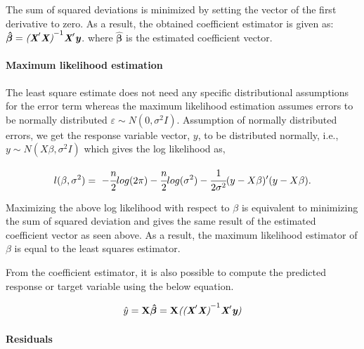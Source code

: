 \documentclass[12 pt]{scrartcl}
\begin{document}
The sum of squared deviations is minimized by setting the vector of the first derivative to zero. As a result, the obtained coefficient estimator is given as:\\
${\boldsymbol{\hat{\beta}}} = {\emph{({\textbf{X}}}'\emph{\textbf{X}}\emph{)}}^{-1} \emph{{\textbf{X}}}'{\emph{{\textbf{y}}}} $.
where ${\boldsymbol{\hat{\beta}}}$ is the estimated coefficient vector. 

\paragraph{Maximum likelihood estimation}
The least square estimate does not need any specific distributional assumptions for the error term whereas the maximum likelihood estimation assumes errors to be normally distributed $\varepsilon \sim  N(0, \sigma^2I)$. Assumption of normally distributed errors, we get  the response variable vector, $y$, to be distributed normally, i.e., $y \sim N(X\beta, \sigma^2I)$ which gives the log likelihood as,

\begin{equation} \label{eq:1} l(\beta, \sigma^2)=\ - \cfrac{n}{2}log(2\pi)- \cfrac{n}{2}log(\sigma^2)-\cfrac{1}{2\sigma^2}(y-X\beta)'(y-X\beta). \end{equation}

Maximizing the above log likelihood with respect to $\beta$ is equivalent to minimizing the sum of squared deviation and gives the same result of the estimated coefficient vector as seen above. As a result, the maximum likelihood estimator of $\beta$  is equal to the least squares estimator.


From the coefficient estimator, it is also possible to compute the predicted response or target variable using the below equation.

\[
\emph{${\hat{y}}$} = {\textbf{X}}{\boldsymbol{\hat{\beta}}} = {\textbf{X}} \emph{(}{\emph{({\textbf{X}}}'\emph{\textbf{X}}\emph{)}}^{-1} \emph{{\textbf{X}}}'{\emph{{\textbf{y}}}}\emph{)}
\]
\citep[p.~105-107]{regression}
\paragraph{Residuals}
\end{document}
